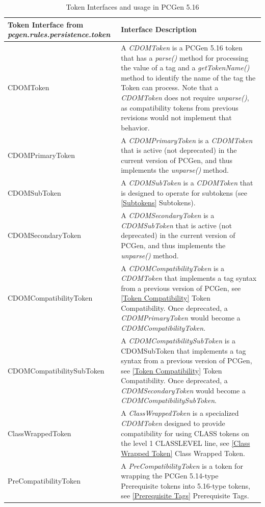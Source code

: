 \documentclass[12pt,letterpaper]{article}
\newcommand{\pcgenversEOS}{5.16}
\newcommand{\pcgenvers}{\pcgenversEOS{} }
\newcommand{\textem}[1]{\emph{#1}}
\newcommand{\myref}[1]{\ref{#1} #1}
\begin{document}
\begin{table}
\begin{center}
\begin{tabular}{ | m{2.1in} | m{4in} | }
\hline
  \textbf{Token Interface from \textem{pcgen.rules.persistence.token}} & \textbf{Interface Description} \\  \hline \hline
  CDOMToken & A \textem{CDOMToken} is a PCGen \pcgenvers token that has a \textem{parse()} method for processing the value of a tag and a \textem{getTokenName()} method  to identify the name of the tag the Token can process.  Note that a \textem{CDOMToken} does not require \textem{unparse()}, as compatibility tokens from previous revisions would not implement that behavior. \\ \hline
  CDOMPrimaryToken & A \textem{CDOMPrimaryToken} is a \textem{CDOMToken} that is active (not deprecated) in the current version of PCGen, and thus implements the \textem{unparse()} method. \\ \hline
  CDOMSubToken & A \textem{CDOMSubToken} is a \textem{CDOMToken} that is designed to operate for subtokens (see \myref{Subtokens}). \\ \hline
  CDOMSecondaryToken & A \textem{CDOMSecondaryToken} is a \textem{CDOMSubToken} that is active (not deprecated) in the current version of PCGen, and thus implements the \textem{unparse()} method. \\ \hline
  CDOMCompatibilityToken & A \textem{CDOMCompatibilityToken} is a \textem{CDOMToken} that implements a tag syntax from a previous version of PCGen, see \myref{Token Compatibility}. Once deprecated, a \textem{CDOMPrimaryToken} would become a \textem{CDOMCompatibilityToken}. \\ \hline
  CDOMCompatibilitySubToken & A \textem{CDOMCompatibilitySubToken} is a CDOMSubToken that implements a tag syntax from a previous version of PCGen, see \myref{Token Compatibility}. Once deprecated, a \textem{CDOMSecondaryToken} would become a \textem{CDOMCompatibilitySubToken}. \\ \hline
  ClassWrappedToken & A \textem{ClassWrappedToken} is a specialized \textem{CDOMToken} designed to provide compatibility for using CLASS tokens on the level 1 CLASSLEVEL line, see \myref{Class Wrapped Token}. \\ \hline
  PreCompatibilityToken & A \textem{PreCompatibilityToken} is a token for wrapping the PCGen 5.14-type Prerequisite tokens into \pcgenversEOS-type tokens, see \myref{Prerequisite Tags}. \\ \hline
\end{tabular}
\end{center}
\caption{Token Interfaces and usage in PCGen \pcgenvers}
\label{Token Interfaces}
\end{table}
\end{document}
